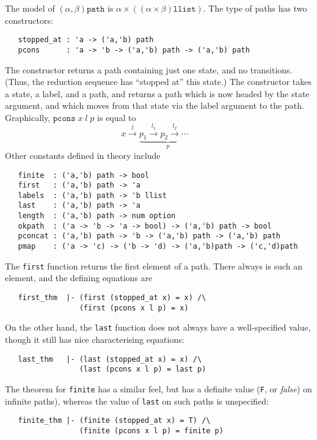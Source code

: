 The model of $(\alpha,\beta)\texttt{path}$ is $\alpha \times
((\alpha\times\beta)\texttt{llist})$.  The type of paths has two
constructors:
{\small
\begin{verbatim}
   stopped_at : 'a -> ('a,'b) path
   pcons      : 'a -> 'b -> ('a,'b) path -> ('a,'b) path
\end{verbatim}
}
The  constructor returns a path containing just one
state, and no transitions.  (Thus, the reduction sequence has
``stopped at'' this state.)  The  constructor takes a state,
a label, and a path, and returns a path which is now headed by the
state argument, and which moves from that state via the label argument
to the path.  Graphically, $\texttt{pcons}\;x\;l\;p$ is equal to
\[
x \stackrel{l}{\longrightarrow}
\underbrace{p_1 \stackrel{l_1}{\longrightarrow} p_2
  \stackrel{l_2}{\longrightarrow} \cdots\quad}_p
\]
Other constants defined in theory  include
%
%
{\small
\begin{verbatim}
   finite  : ('a,'b) path -> bool
   first   : ('a,'b) path -> 'a
   labels  : ('a,'b) path -> 'b llist
   last    : ('a,'b) path -> 'a
   length  : ('a,'b) path -> num option
   okpath  : ('a -> 'b -> 'a -> bool) -> ('a,'b) path -> bool
   pconcat : ('a,'b) path -> 'b -> ('a,'b) path -> ('a,'b) path
   pmap    : ('a -> 'c) -> ('b -> 'd) -> ('a,'b)path -> ('c,'d)path
\end{verbatim}
}

The \texttt{first} function returns the first element of a path.
There always is such an element, and the defining equations are
{\small
\begin{verbatim}
   first_thm  |- (first (stopped_at x) = x) /\
                 (first (pcons x l p) = x)
\end{verbatim}
}

On the other hand, the \texttt{last} function does not always have a
well-specified value, though it still has nice characterising
equations:
{\small
\begin{verbatim}
   last_thm   |- (last (stopped_at x) = x) /\
                 (last (pcons x l p) = last p)
\end{verbatim}
}

The theorem for \texttt{finite} has a similar feel, but has a definite
value (\texttt{F}, or \emph{false}) on infinite paths), whereas the
value of \texttt{last} on such paths is unspecified:
{\small
\begin{verbatim}
   finite_thm |- (finite (stopped_at x) = T) /\
                 (finite (pcons x l p) = finite p)
\end{verbatim}
}

